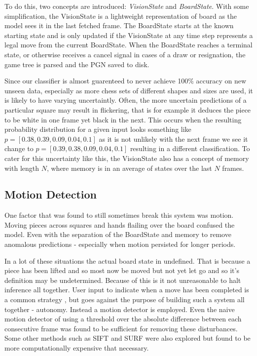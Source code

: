 To do this, two concepts are introduced: \textit{VisionState} and \textit{BoardState}.  With some simplification, the VisionState is a lightweight 
representation of board as the model sees it in the last fetched frame.  The BoardState starts at the known starting state and is only updated if the VisionState at 
any time step represents a legal move from the current BoardState.  When the BoardState reaches a terminal state, or otherwise receives a cancel signal in cases of a 
draw or resignation, the game tree is parsed and the PGN saved to disk.

Since our classifier is almost guarenteed to never achieve 100\% accuracy on new unseen data, especially as more chess sets of different shapes and sizes are used, it 
is likely to have varying uncertaintly.  Often, the more uncertain predictions of a particular square may result in flickering, that is for example it deduces the piece to 
be white in one frame yet black in the next.  This occurs when the resulting probability distribution for a given input looks something like 
$p = [0.38, 0.39, 0.09, 0.04, 0.1]$ as it is not unlikely with the next frame we see it change to $p = [0.39, 0.38, 0.09, 0.04, 0.1]$ resulting in a different classification.
To cater for this uncertainty like this, the VisionState also has a concept of memory with length $N$, where memory is in an average of states 
over the last $N$ frames.

\subsection{Motion Detection}
One factor that was found to still sometimes break this system was motion.  Moving pieces across squares and hands flailing over the board confused the
model.  Even with the separation of the BoardState and memory to remove anomalous predictions - especially when motion persisted for longer periods.  

In a lot of these situations the actual board state in undefined.  That is because a piece has been lifted and so most now be moved but not yet let go 
and so it's definition may be undetermined.  Because of this is it not unreasonable to halt inference all together.  User input to indicate when a move
has been completed is a common strategy \cite{}, but goes against the purpose of building such a system all together - autonomy.  Instead a motion detector is 
employed.  Even the naive motion detector of using a threshold over the absolute difference between each consecutive frame was found to be sufficient for removing these
disturbances.  Some other methods such as SIFT and SURF were also explored but found to be more computationally expensive that necessary.

